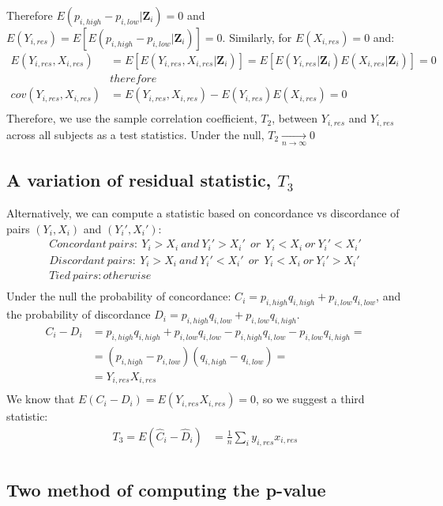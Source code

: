 \documentclass[]{article}
\begin{document}
Therefore $E(p_{i,high} - p_{i,low}|\pmb{Z}_i)=0$ and $E(Y_{i,res})=E[E(p_{i,high} - p_{i,low}|\pmb{Z}_i)]=0$. Similarly, for $E(X_{i,res})=0$ and:
$$
\begin{aligned}
	E(Y_{i,res},X_{i,res}) &= E[E(Y_{i,res},X_{i,res}|\pmb{Z}_i)] = E[E(Y_{i,res}|\pmb{Z}_i)E(X_{i,res}|\pmb{Z}_i)] = 0\\
	&therefore\\
	cov(Y_{i,res},X_{i,res}) &= E(Y_{i,res},X_{i,res}) - E(Y_{i,res})E(X_{i,res}) = 0\\
\end{aligned}
$$
Therefore, we use the sample correlation coefficient, $T_2$, between $Y_{i,res}$ and $Y_{i,res}$ across all subjects as a test statistics. Under the null, $T_2\underset{n\rightarrow \infty}{\longrightarrow}0$
\subsection{A variation of residual statistic, $T_3$}
Alternatively, we can compute a statistic based on concordance vs discordance of pairs $(Y_i, X_i)$ and $(Y_i', X_i')$:
$$
\begin{aligned}
	Concordant ~pairs: ~Y_i>X_i ~and ~Y_i'>X_i'~~or~~ Y_i<X_i ~or~ Y_i'<X_i'\\
	Discordant ~pairs: ~Y_i>X_i ~and ~Y_i'<X_i'~~or~~ Y_i<X_i ~or~ Y_i'>X_i'\\
	Tied ~pairs: otherwise\\
\end{aligned}
$$
 Under the null the probability of concordance: $C_i = p_{i,high}q_{i,high} + p_{i,low}q_{i,low}$, and the probability of discordance $D_i = p_{i,high}q_{i,low} + p_{i,low}q_{i,high}$. 
$$
\begin{aligned}
	C_i - D_i &= p_{i,high}q_{i,high} + p_{i,low}q_{i,low} -p_{i,high}q_{i,low} - p_{i,low}q_{i,high}=\\
	 &= (p_{i,high}-p_{i,low}) (q_{i,high} - q_{i,low})=\\
	 &=Y_{i,res}X_{i,res}\\
\end{aligned}
$$
We know that $E(C_i - D_i)=E(Y_{i,res}X_{i,res}) = 0$, so we suggest a third statistic:
$$
\begin{aligned}
	T_3 = E(\hat{C}_i - \hat{D}_i) &=\frac{1}{n} \sum_i y_{i,res}x_{i,res}\\
\end{aligned}
$$
\subsection{Two method of computing the p-value}
\end{document}

